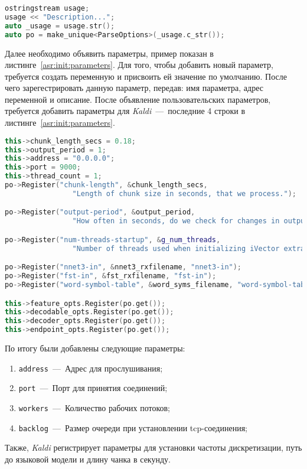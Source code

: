 \begin{lstlisting}[caption={Обработка аргументов},label={asr:init:options},language=C++]
ostringstream usage;
usage << "Description...";
auto _usage = usage.str();
auto po = make_unique<ParseOptions>(_usage.c_str());

\end{lstlisting}

Далее необходимо объявить параметры, пример показан в листинге~\ref{asr:init:parameters}.
Для того, чтобы добавить новый параметр, требуется создать переменную и присвоить ей
значение по умолчанию. После чего зарегестрировать данную параметр, передав:
имя параметра, адрес переменной и описание. После объявление пользовательских
параметров, требуется добавить параметры для \textit{Kaldi}~---~последние 4 строки в
листинге~\ref{asr:init:parameters}.

\begin{lstlisting}[caption={Пример объявление параметров},label={asr:init:parameters},language=C++]
this->chunk_length_secs = 0.18;
this->output_period = 1;
this->address = "0.0.0.0";
this->port = 9000;
this->thread_count = 1;
po->Register("chunk-length", &chunk_length_secs,
                "Length of chunk size in seconds, that we process.");

po->Register("output-period", &output_period,
                "How often in seconds, do we check for changes in output.");

po->Register("num-threads-startup", &g_num_threads,
                "Number of threads used when initializing iVector extractor.");

po->Register("nnet3-in", &nnet3_rxfilename, "nnet3-in");
po->Register("fst-in", &fst_rxfilename, "fst-in");
po->Register("word-symbol-table", &word_syms_filename, "word-symbol-table");

this->feature_opts.Register(po.get());
this->decodable_opts.Register(po.get());
this->decoder_opts.Register(po.get());
this->endpoint_opts.Register(po.get());

\end{lstlisting}

По итогу были добавлены следующие параметры:
\begin{enumerate}
    \item \texttt{address}~---~Адрес для прослушивания;
    \item \texttt{port}~---~Порт для принятия соединений;
    \item \texttt{workers}~---~Количество рабочих потоков;
    \item \texttt{backlog}~---~Размер очереди при установлении tcp-соединения;
\end{enumerate}
Также, \textit{Kaldi} регистрирует параметры для установки частоты дискретизации,
путь до языковой модели и длину чанка в секунду.

